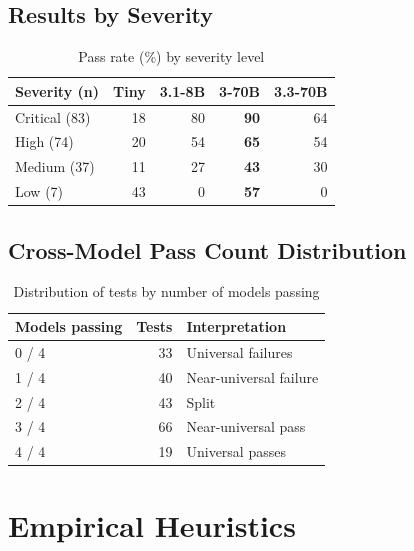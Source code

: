 \documentclass[conference]{IEEEtran}
\begin{document}
\subsection{Results by Severity}

\begin{table}[htbp]
  \caption{Pass rate (\%) by severity level}
  \label{tab:byseverity}
  \centering
  \scriptsize
  \setlength{\tabcolsep}{4pt}
  \begin{tabular}{lrrrr}
    \toprule
    \textbf{Severity (n)}
      & \textbf{Tiny} & \textbf{3.1-8B}
      & \textbf{3-70B} & \textbf{3.3-70B} \\
    \midrule
    Critical (83) & 18 & 80 & \textbf{90} & 64 \\
    High (74)     & 20 & 54 & \textbf{65} & 54 \\
    Medium (37)   & 11 & 27 & \textbf{43} & 30 \\
    Low (7)       & 43 &  0 & \textbf{57} &  0 \\
    \bottomrule
  \end{tabular}
\end{table}

\subsection{Cross-Model Pass Count Distribution}

\begin{table}[htbp]
  \caption{Distribution of tests by number of models passing}
  \label{tab:distribution}
  \centering
  \small
  \begin{tabular}{lrl}
    \toprule
    \textbf{Models passing} & \textbf{Tests} & \textbf{Interpretation} \\
    \midrule
    0 / 4 & 33 & Universal failures \\
    1 / 4 & 40 & Near-universal failure \\
    2 / 4 & 43 & Split \\
    3 / 4 & 66 & Near-universal pass \\
    4 / 4 & 19 & Universal passes \\
    \bottomrule
  \end{tabular}
\end{table}

\section{Empirical Heuristics}
\label{sec:heuristics}
\end{document}
